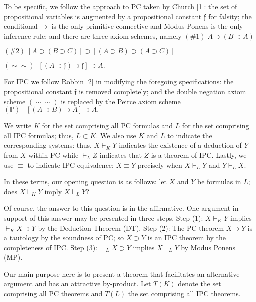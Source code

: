 \documentclass[10pt]{amsart}
\theoremstyle{plain}
\numberwithin{equation}{section}
\begin{document}
To be specific, we follow the approach to PC taken by Church [1]: the set of propositional variables is augmented by a propositional constant $\mathfrak{f}$ for falsity; the conditional $\supset$ is the only primitive connective and Modus Ponens is the only inference rule; and there are three axiom schemes, namely 
\medbreak 
$(\#1) \; A \supset (B \supset A)$ \par 
$(\#2) \; [A \supset (B \supset C)] \supset [(A \supset B) \supset (A \supset C)]$ \par
$(\sim \sim) \; \; [(A \supset \mathfrak{f}) \supset \mathfrak{f}] \supset A.$ \par
\medbreak 
\noindent
For IPC we follow Robbin [2] in modifying the foregoing specifications: the propositional constant $\mathfrak{f}$ is removed completely; and the double negation axiom scheme $(\sim \sim)$ is replaced by the Peirce axiom scheme 
\medbreak 
$(\mathbb{P}) \; \; \; [(A \supset B) \supset A] \supset A.$ \par 
\medbreak 
\noindent
We write $K$ for the set comprising all PC formulas and $L$ for the set comprising all IPC formulas; thus, $L \subset K$. We also use $K$ and $L$ to indicate the corresponding systems: thus, $X \vdash_K Y$ indicates the existence of a deduction of $Y$ from $X$ within PC while $\vdash_L Z$ indicates that $Z$ is a theorem of IPC. Lastly, we use $\equiv$ to indicate IPC equivalence: $X \equiv Y$ precisely when $X \vdash_L Y$ and $Y \vdash_L X$. 

\medbreak 

In these terms, our opening question is as follows: let $X$ and $Y$ be formulas in $L$; does $X \vdash_K Y$ imply  $X \vdash_L Y$? 

\medbreak 

Of course, the answer to this question is in the affirmative. One argument in support of this answer may be presented in three steps. Step (1): $X \vdash_K Y$ implies $\vdash_K X \supset Y$ by the Deduction Theorem (DT). Step (2): The PC theorem $X \supset Y$ is a tautology by the soundness of PC; so $X \supset Y$ is an IPC theorem by the completeness of IPC. Step (3): $\vdash_L X \supset Y$ implies $X \vdash_L Y$ by Modus Ponens (MP). 

\medbreak 

Our main purpose here is to present a theorem that facilitates an alternative argument and has an attractive by-product. Let $T(K)$ denote the set comprising all PC theorems and $T(L)$ the set comprising all IPC theorems. 
\end{document}
